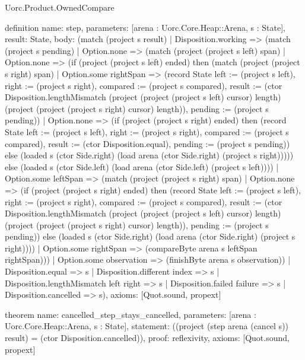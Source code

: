 \begin{lexlean}{Uorc.Product.OwnedCompare}
\begin{semanticmodule}
definition{
  name: step,
  parameters: [arena : Uorc.Core.Heap::Arena, s : State],
  result: State,
  body: (match (project s result)
    | Disposition.working => (match (project s pending)
      | Option.none => (match (project (project s left) span)
        | Option.none => (if (project (project s left) ended) then (match (project (project s right) span)
          | Option.some rightSpan => (record State {left := (project s left), right := (project s right), compared := (project s compared), result := (ctor Disposition.lengthMismatch (project (project (project s left) cursor) length) (project (project (project s right) cursor) length)), pending := (project s pending)})
          | Option.none => (if (project (project s right) ended) then (record State {left := (project s left), right := (project s right), compared := (project s compared), result := (ctor Disposition.equal), pending := (project s pending)}) else (loaded s (ctor Side.right) (load arena (ctor Side.right) (project s right))))) else (loaded s (ctor Side.left) (load arena (ctor Side.left) (project s left))))
        | Option.some leftSpan => (match (project (project s right) span)
          | Option.none => (if (project (project s right) ended) then (record State {left := (project s left), right := (project s right), compared := (project s compared), result := (ctor Disposition.lengthMismatch (project (project (project s left) cursor) length) (project (project (project s right) cursor) length)), pending := (project s pending)}) else (loaded s (ctor Side.right) (load arena (ctor Side.right) (project s right))))
          | Option.some rightSpan => (compareByte arena s leftSpan rightSpan)))
      | Option.some observation => (finishByte arena s observation))
    | Disposition.equal => s
    | Disposition.different index => s
    | Disposition.lengthMismatch left right => s
    | Disposition.failed failure => s
    | Disposition.cancelled => s),
  axioms: [Quot.sound, propext]
}

theorem{
  name: cancelled_step_stays_cancelled,
  parameters: [arena : Uorc.Core.Heap::Arena, s : State],
  statement: ((project (step arena (cancel s)) result) = (ctor Disposition.cancelled)),
  proof: reflexivity{},
  axioms: [Quot.sound, propext]
}


\end{semanticmodule}
\end{lexlean}
